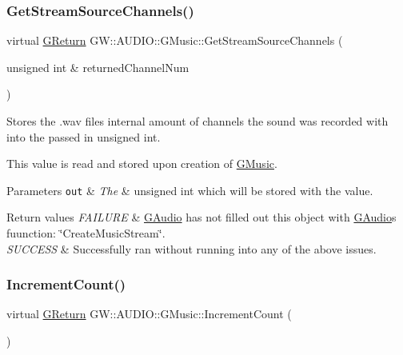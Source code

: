 \subsubsection{\texorpdfstring{Get\+Stream\+Source\+Channels()}{GetStreamSourceChannels()}}
{\footnotesize\ttfamily virtual \hyperlink{namespaceGW_a67a839e3df7ea8a5c5686613a7a3de21}{G\+Return} G\+W\+::\+A\+U\+D\+I\+O\+::\+G\+Music\+::\+Get\+Stream\+Source\+Channels (\begin{DoxyParamCaption}\item[{unsigned int \&}]{returned\+Channel\+Num }\end{DoxyParamCaption})\hspace{0.3cm}{\ttfamily [pure virtual]}}



Stores the .wav files internal amount of channels the sound was recorded with into the passed in unsigned int. 

This value is read and stored upon creation of \hyperlink{classGW_1_1AUDIO_1_1GMusic}{G\+Music}.


\begin{DoxyParams}[1]{Parameters}
\mbox{\tt out}  & {\em The} & unsigned int which will be stored with the value.\\
\hline
\end{DoxyParams}

\begin{DoxyRetVals}{Return values}
{\em F\+A\+I\+L\+U\+RE} & \hyperlink{classGW_1_1AUDIO_1_1GAudio}{G\+Audio} has not filled out this object with \hyperlink{classGW_1_1AUDIO_1_1GAudio}{G\+Audio}\textquotesingle{}s fuunction\+: \char`\"{}\+Create\+Music\+Stream\char`\"{}. \\
\hline
{\em S\+U\+C\+C\+E\+SS} & Successfully ran without running into any of the above issues. \\
\hline
\end{DoxyRetVals}
\mbox{\label{classGW_1_1AUDIO_1_1GMusic_a22d7a170b4d307e5398ebb92f950431f}} 
\subsubsection{\texorpdfstring{Increment\+Count()}{IncrementCount()}}
{\footnotesize\ttfamily virtual \hyperlink{namespaceGW_a67a839e3df7ea8a5c5686613a7a3de21}{G\+Return} G\+W\+::\+A\+U\+D\+I\+O\+::\+G\+Music\+::\+Increment\+Count (\begin{DoxyParamCaption}{ }\end{DoxyParamCaption})\hspace{0.3cm}{\ttfamily [pure virtual]}}



